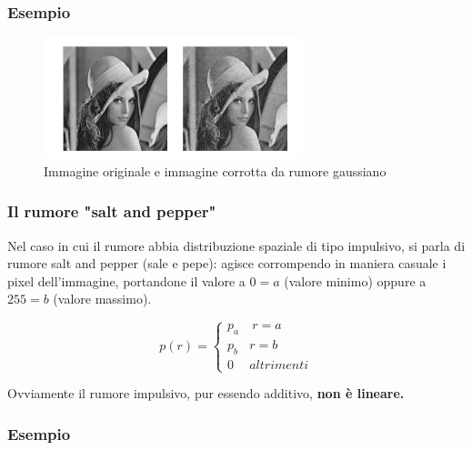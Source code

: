 
\subsubsection{Esempio}

\begin{figure}[H]
    \centering
    \includegraphics[width=\linewidth, keepaspectratio]{capitoli/immagini/imgs/esempio-rumore.png}
    \caption*{Immagine originale e immagine corrotta da rumore gaussiano}
\end{figure}

\subsubsection{Il rumore "salt and pepper"}

Nel caso in cui il rumore abbia distribuzione spaziale di tipo impulsivo, si parla di rumore salt and pepper (sale e pepe): agisce
corrompendo in maniera casuale i pixel dell’immagine, portandone il valore a $0=a$ (valore minimo) oppure a $255=b$ (valore massimo).
\begin{center}
    $$
        p(r) = \left\{ \begin{array}{cl}
            p_a & \ r = a    \\
            p_b & r = b      \\
            0   & altrimenti
        \end{array} \right.
    $$
\end{center}
Ovviamente il rumore impulsivo, pur essendo additivo, \textbf{non è
    lineare.}


\subsubsection{Esempio}

